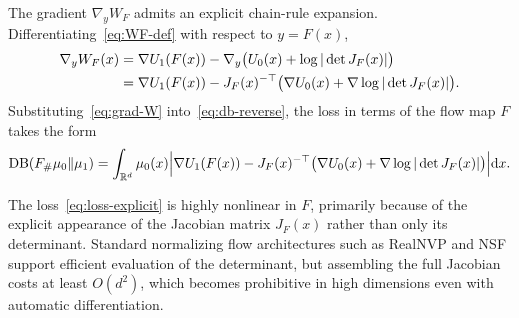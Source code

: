 \documentclass{article}
\newcommand{\D}{\mathrm{d}}
\newcommand{\DB}{\mathrm{DB}}
\theoremstyle{plain}
\begin{document}
The gradient $\nabla_y W_F$ admits an explicit chain-rule expansion. Differentiating~\eqref{eq:WF-def} with respect to $y = F(x)$,
\begin{align}\label{eq:grad-W}
    \nabla_y W_F(x) & = \nabla U_1(F(x)) - \nabla_y\bigl(U_0(x) + \log|\det J_F(x)|\bigr) \notag\\
    & = \nabla U_1(F(x)) - J_F(x)^{-\top} \bigl(\nabla U_0(x) + \nabla \log|\det J_F(x)|\bigr).
\end{align}
Substituting~\eqref{eq:grad-W} into~\eqref{eq:db-reverse}, the loss in terms of the flow map $F$ takes the form
\begin{equation}\label{eq:loss-explicit}
    \DB(F_{\#}\mu_0 \| \mu_1) = \int_{\mathbb R^d} \mu_0(x) \Bigl|\nabla U_1(F(x)) - J_F(x)^{-\top} \bigl(\nabla U_0(x) + \nabla \log|\det J_F(x)|\bigr)\Bigr| \D x.
\end{equation}

The loss~\eqref{eq:loss-explicit} is highly nonlinear in $F$, primarily because of the explicit appearance of the Jacobian matrix $J_F(x)$ rather than only its determinant. Standard normalizing flow architectures such as RealNVP and NSF support efficient evaluation of the determinant, but assembling the full Jacobian costs at least $O(d^2)$, which becomes prohibitive in high dimensions even with automatic differentiation.
\end{document}
